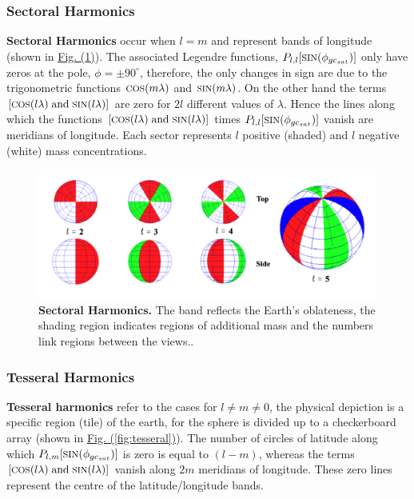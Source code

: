 \begin{multicols}{2}
\subsubsection{Sectoral Harmonics}
\textbf{Sectoral Harmonics} occur when $l=m$ and represent bands of longitude (shown in \hyperref[fig:sectoral]{Fig. (\ref*{fig:sectoral})}). The associated Legendre functions, $P_{l,l}[\text{\footnotesize{SIN}}(\phi_{gc_{sat}})]$ only have zeros at the pole, $\phi = \pm90^{\circ}$, therefore, the only changes in sign are due to the trigonometric functions $\text{\footnotesize{COS}}(m\lambda)$ and $\text{\footnotesize{SIN}}(m\lambda)$. On the other hand the terms $[\text{\footnotesize{COS}}(l\lambda)\hspace*{0.1cm}\text{and}\hspace*{0.1cm}\text{\footnotesize{SIN}}(l\lambda)]$ are zero for $2l$ different values of $\lambda$. Hence the lines along which the functions $[\text{\footnotesize{COS}}(l\lambda)\hspace*{0.1cm}\text{and}\hspace*{0.1cm}\text{\footnotesize{SIN}}(l\lambda)]$ times $P_{l,l}[\text{\footnotesize{SIN}}(\phi_{gc_{sat}})]$ vanish are meridians of longitude. Each sector represents $l$ positive (shaded) and $l$ negative (white) mass concentrations.
\end{multicols}
\begin{figure}[H]
    \centering
    \includegraphics[width=.78\textwidth]{perturbation/sectoral}
    \caption{\textbf{Sectoral Harmonics.} The band reflects the Earth's oblateness, the shading region indicates regions of additional mass and the numbers link regions  between the views.\cite[]{}.}
    \label{fig:sectoral}
\end{figure}

\begin{multicols}{2}
\subsubsection{Tesseral Harmonics}
\textbf{Tesseral harmonics} refer to the cases for $l\neq m\neq0$, the physical depiction is a specific region (tile) of the earth, for the sphere is divided up to a checkerboard array (shown in \hyperref[fig:tesseral]{Fig. (\ref*{fig:tesseral})}). The number of circles of latitude along which $P_{l,m}[\text{\footnotesize{SIN}}(\phi_{gc_{sat}})]$ is zero is equal to $(l-m)$, whereas the terms $[\text{\footnotesize{COS}}(l\lambda)\hspace*{0.1cm}\text{and}\hspace*{0.1cm}\text{\footnotesize{SIN}}(l\lambda)]$ vanish along $2m$ meridians of longitude. These zero lines represent the centre of the latitude/longitude bands.
\end{multicols}

